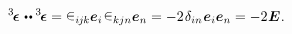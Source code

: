 \begin{otherlanguage}{russian}
\nopagebreak\vspace{-0.1em}\begin{equation}
\hspace{4.4em} \levicivitatensor \hspace{.2ex} \dotdotp \levicivitatensor = \levicivita_{i\hspace{-0.1ex}j\hspace{-0.1ex}k} \bm{e}_i \hspace{.2ex} \levicivita_{kjn} \bm{e}_n = - 2 \hspace{.2ex} \delta_{in} \hspace{.12ex} \bm{e}_i \bm{e}_n = - 2 \hspace{.1ex} \bm{E}
\hspace{.1ex} .
\end{equation}

\end{otherlanguage}



\label{para:tensors.symmetric+skewsymmetric}

